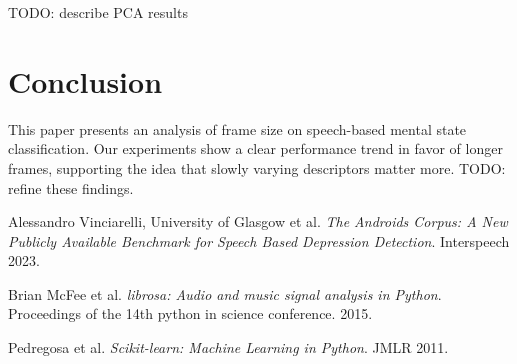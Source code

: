 \documentclass[conference]{IEEEtran}
\begin{document}
TODO: describe PCA results

\section{Conclusion}
This paper presents an analysis of frame size on speech-based mental state classification. 
Our experiments show a clear performance trend in favor of longer frames, supporting the idea that slowly varying descriptors matter more. 
TODO: refine these findings.

\begin{thebibliography}{9}
Alessandro Vinciarelli, University of Glasgow et al. \textit{The Androids Corpus: A New Publicly Available Benchmark for Speech Based Depression Detection}. Interspeech 2023.

Brian McFee et al. \textit{librosa: Audio and music signal analysis in Python}. Proceedings of the 14th python in science conference. 2015.

Pedregosa et al. \textit{Scikit-learn: Machine Learning in Python}. JMLR 2011.

\end{thebibliography}
\end{document}
